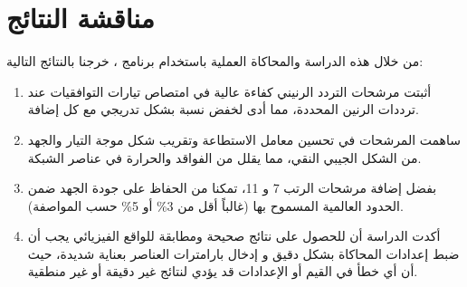 \section{مناقشة النتائج} \label{part1:sec4}

من خلال هذه الدراسة والمحاكاة العملية باستخدام برنامج ، خرجنا بالنتائج التالية:

\begin{enumerate}
    \item أثبتت مرشحات التردد الرنيني  كفاءة عالية في امتصاص تيارات التوافقيات عند ترددات الرنين المحددة، مما أدى لخفض نسبة  بشكل تدريجي مع كل إضافة.
    \item ساهمت المرشحات في تحسين معامل الاستطاعة وتقريب شكل موجة التيار والجهد من الشكل الجيبي النقي، مما يقلل من الفواقد والحرارة في عناصر الشبكة.
    \item بفضل إضافة مرشحات الرتب 7 و 11، تمكنا من الحفاظ على جودة الجهد ضمن الحدود العالمية المسموح بها (غالباً أقل من 3\% أو 5\% حسب المواصفة).
    \item أكدت الدراسة أن للحصول على نتائج صحيحة ومطابقة للواقع الفيزيائي يجب أن ضبط إعدادات المحاكاة بشكل دقيق و إدخال بارامترات العناصر بعناية شديدة، حيث أن أي خطأ في القيم أو الإعدادات قد يؤدي لنتائج غير دقيقة أو غير منطقية.
\end{enumerate}
